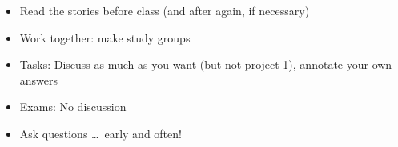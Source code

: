 \documentclass[a4paper,landscape,headrule,footrule,xetex,25pt]{foils}
\begin{document}

\begin{itemize}
\item Read the stories before class (and after again, if necessary)
\item Work together: make study groups
\item Tasks: Discuss as much as you want (but not project 1), annotate your own answers
\item Exams: No discussion
\item Ask questions \ldots\ early and often!
\end{itemize}



\end{document}
